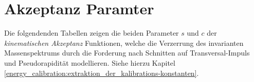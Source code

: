 


\chapter{Akzeptanz Paramter}
Die folgendenden Tabellen zeigen die beiden Parameter $s$ und $c$ der
\textit{kinematischen Akzeptanz} Funktionen, welche die Verzerrung des
invarianten Massenspektrums durch die Forderung nach Schnitten auf
Transversal-Impuls und Pseudorapidität modellieren. Siehe hierzu Kapitel
\ref{energy_calibration:extraktion_der_kalibrations-konstanten}.
